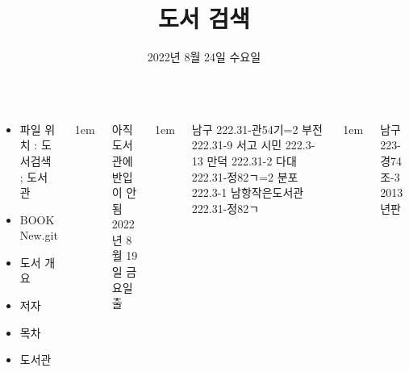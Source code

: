 \documentclass[	20pt, 
							a1paper, 
							portrait, %
							margin=0mm, %
							innermargin=10mm,  		%
							blockverticalspace=4mm, %
							colspace=5mm, 
							subcolspace=0mm
							]{tikzposter}
\title{도서 검색}
\author{ 2022년 8월 24일 수요일  }
\begin{document}
	\maketitle

	\begin{columns}


			{
				\begin{LARGE}
			\begin{itemize}
				\item 파일 위치 : 도서검색 ; 도서관
				\item BOOK New.git
				\item 도서 개요
				\item 저자
				\item 목차
				\item 도서관
			\end{itemize}
				\end{LARGE}
			}



			{
					\setlength{\leftmargini}{7em}
					\setlength{\labelsep} {1em}
				\begin{LARGE}
				아직 도서관에 반입이 안됨 \\
				2022년 8월 19일 금요일 출
				\end{LARGE}
			}


			{
					\setlength{\leftmargini}{7em}
					\setlength{\labelsep} {1em}
				\begin{LARGE}

남구    222.31-관54기=2 
부전   222.31-9 서고 
시민  222.3-13 
만덕  222.31-2  
다대  222.31-정82ㄱ=2 
분포  222.3-1   
남항작은도서관  222.31-정82ㄱ  
				\end{LARGE}
			}




			{
					\setlength{\leftmargini}{7em}
					\setlength{\labelsep} {1em}
				\begin{LARGE}
남구 223-경74조-3   2013년판


\end{LARGE}}
\end{columns}
\end{document}
